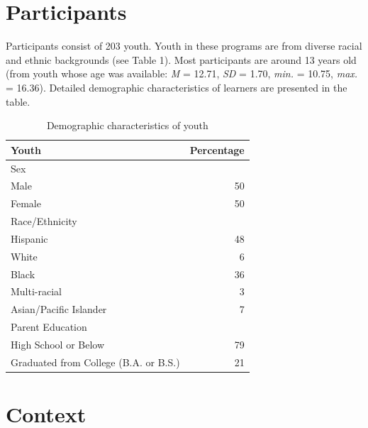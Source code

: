 \documentclass[]{msu-thesis}
\theoremstyle{definition}
\theoremstyle{definition}
\theoremstyle{definition}
\theoremstyle{remark}
\begin{document}
\section{Participants}\label{participants}

Participants consist of 203 youth. Youth in these programs are from
diverse racial and ethnic backgrounds (see Table 1). Most participants
are around 13 years old (from youth whose age was available: \emph{M} =
12.71, \emph{SD} = 1.70, \emph{min.} = 10.75, \emph{max.} = 16.36).
Detailed demographic characteristics of learners are presented in the
table.

\begin{table}

\caption{\label{tab:unnamed-chunk-3}Demographic characteristics of youth}
\centering
\begin{tabular}[t]{lr}
\toprule
Youth & Percentage\\
\midrule
Sex & \\
Male & 50\\
Female & 50\\
Race/Ethnicity & \\
Hispanic & 48\\
\addlinespace
White & 6\\
Black & 36\\
Multi-racial & 3\\
Asian/Pacific Islander & 7\\
Parent Education & \\
\addlinespace
High School or Below & 79\\
Graduated from College (B.A. or B.S.) & 21\\
\bottomrule
\end{tabular}
\end{table}

\section{Context}\label{context}
\end{document}
